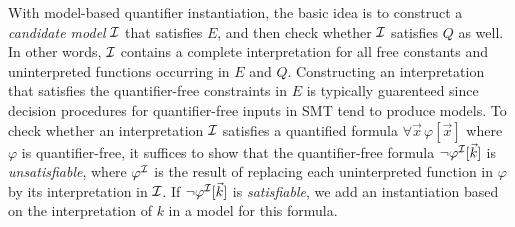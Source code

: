 \documentclass[oribibl]{llncs}
\begin{document}
With model-based quantifier instantiation, the basic idea is
to construct a \emph{candidate model} $\mathcal{I}$ that satisfies $E$, 
and then check whether $\mathcal{I}$ satisfies $Q$ as well.
In other words, $\mathcal{I}$ contains a complete interpretation for all free constants and uninterpreted functions occurring in $E$ and $Q$.
Constructing an interpretation that satisfies the quantifier-free constraints in $E$
is typically guarenteed since decision procedures for quantifier-free inputs in SMT tend to produce models.
To check whether an interpretation $\mathcal{I}$ satisfies a quantified formula $\forall \vec x\, \varphi[ \vec x ]$ where $\varphi$ is quantifier-free,
it suffices to show that the quantifier-free formula $\neg \varphi^{\mathcal{I}}[ \vec k ]$ is \emph{unsatisfiable},
where $\varphi^{\mathcal{I}}$ is the result of replacing each uninterpreted function in $\varphi$
by its interpretation in $\mathcal{I}$.
If $\neg \varphi^{\mathcal{I}}[ \vec k ]$ is \emph{satisfiable}, we add an instantiation based on the interpretation of $k$ in a model
for this formula.
\end{document}
